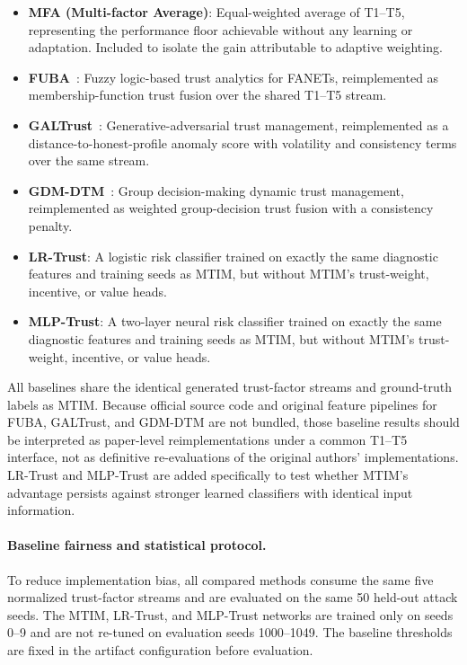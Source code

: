 \documentclass[notspecified,article,submit,moreauthors]{Definitions/mdpi}
\begin{document}
\begin{itemize}[topsep=0pt,itemsep=2pt]
    \item \textbf{MFA (Multi-factor Average)}: Equal-weighted average of T1--T5, representing the performance floor achievable without any learning or adaptation. Included to isolate the gain attributable to adaptive weighting.
    \item \textbf{FUBA}~\cite{benfriha2024fuba}: Fuzzy logic-based trust analytics for FANETs, reimplemented as membership-function trust fusion over the shared T1--T5 stream.
    \item \textbf{GALTrust}~\cite{akram2024galtrust}: Generative-adversarial trust management, reimplemented as a distance-to-honest-profile anomaly score with volatility and consistency terms over the same stream.
    \item \textbf{GDM-DTM}~\cite{hu2025gdm}: Group decision-making dynamic trust management, reimplemented as weighted group-decision trust fusion with a consistency penalty.
    \item \textbf{LR-Trust}: A logistic risk classifier trained on exactly the same diagnostic features and training seeds as MTIM, but without MTIM's trust-weight, incentive, or value heads.
    \item \textbf{MLP-Trust}: A two-layer neural risk classifier trained on exactly the same diagnostic features and training seeds as MTIM, but without MTIM's trust-weight, incentive, or value heads.
\end{itemize}

All baselines share the identical generated trust-factor streams and ground-truth labels as MTIM. Because official source code and original feature pipelines for FUBA, GALTrust, and GDM-DTM are not bundled, those baseline results should be interpreted as paper-level reimplementations under a common T1--T5 interface, not as definitive re-evaluations of the original authors' implementations. LR-Trust and MLP-Trust are added specifically to test whether MTIM's advantage persists against stronger learned classifiers with identical input information.

\paragraph{Baseline fairness and statistical protocol.}
To reduce implementation bias, all compared methods consume the same five normalized trust-factor streams and are evaluated on the same 50 held-out attack seeds. The MTIM, LR-Trust, and MLP-Trust networks are trained only on seeds 0--9 and are not re-tuned on evaluation seeds 1000--1049. The baseline thresholds are fixed in the artifact configuration before evaluation.
\end{document}
